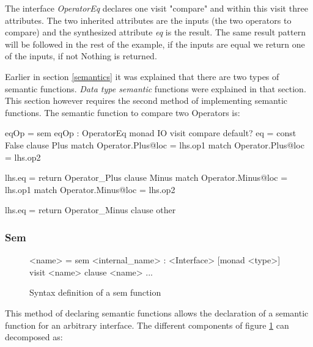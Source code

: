 The interface \emph{OperatorEq} declares one visit "compare" and within this visit three attributes. The two inherited attributes are the inputs (the two operators to compare) and the synthesized attribute \emph{eq} is the result. The same result pattern will be followed in the rest of the example, if the inputs are equal we return one of the inputs, if not Nothing is returned.

Earlier in section \ref{semantics} it was explained that there are two types of semantic functions. \emph{Data type semantic} functions were explained in that section. This section however requires the second method of implementing semantic functions. The semantic function to compare two Operators is:

\begin{code}
{
eqOp = sem eqOp : OperatorEq monad IO
         visit compare
           default? eq = const False
           clause Plus
             match Operator.Plus@loc = lhs.op1
             match Operator.Plus@loc = lhs.op2
             
             lhs.eq = return Operator_Plus
           clause Minus
             match Operator.Minus@loc = lhs.op1
             match Operator.Minus@loc = lhs.op2

             lhs.eq = return Operator_Minus
           clause other
}
\end{code}

\subsubsection{Sem}
\begin{figure}[!h]
\begin{code}
<name> = sem <internal_name> : <Interface> [monad <type>]
          {visit <name>
             {clause <name>
                ...
             }
          }
\end{code}
\caption{Syntax definition of a sem function}
\label{sem:syntax}
\end{figure}

This method of declaring semantic functions allows the declaration of a semantic function for an arbitrary interface. The different components of figure \ref{sem:syntax} can decomposed as:

